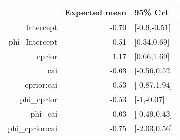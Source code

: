 \begin{tabular}{rrl}
  \hline
 & Expected mean & 95\% CrI \\ 
  \hline
Intercept & -0.70 & [-0.9,-0.51] \\ 
  phi\_Intercept & 0.51 & [0.34,0.69] \\ 
  cprior & 1.17 & [0.66,1.69] \\ 
  cai & -0.03 & [-0.56,0.52] \\ 
  cprior:cai & 0.53 & [-0.87,1.94] \\ 
  phi\_cprior & -0.53 & [-1,-0.07] \\ 
  phi\_cai & -0.03 & [-0.49,0.43] \\ 
  phi\_cprior:cai & -0.75 & [-2.03,0.56] \\ 
   \hline
\end{tabular}

